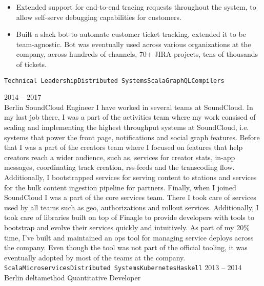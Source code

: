 \documentclass[9pt]{developercv} %
\begin{document}
\begin{entrylist}
{\begin{itemize}
				\item Extended support for end-to-end tracing requests throughout the system, to allow self-serve debugging capabilities for customers.
				\item Built a slack bot to automate customer ticket tracking, extended it to be team-agnostic. Bot was eventually used across various organizations at the company, across hundreds of channels, 70+ JIRA projects, tens of thousands of tickets.
			\end{itemize}
			\texttt{Technical Leadership}\slashsep\texttt{Distributed Systems}\slashsep\texttt{Scala}\slashsep\texttt{GraphQL}\slashsep\texttt{Compilers}
		}
	\entry
		{2014 -- 2017\\\footnotesize{Berlin}}
		{SoundCloud}
		{Engineer}
		{
			I have worked in several teams at SoundCloud. In my last job there, I was a part of the activities team where my work consised of scaling and implementing the highest throughput systems at SoundCloud, i.e. systems that power the front page, notifications and social graph features.\newline\newline
			Before that I was a part of the creators team where I focused on features that help creators reach a wider audience, such as, services for creator stats, in-app messages, coordinating track creation, rss-feeds and the transcoding flow. Additionally, I bootstrapped services for serving content to stations and services for the bulk content ingestion pipeline for partners.\newline\newline
			Finally, when I joined SoundCloud I was a part of the core services team. There I took care of services used by all teams such as geo, authorizations and rollout services. Additionally, I took care of libraries built on top of Finagle to provide developers with tools to bootstrap and evolve their services quickly and intuitively.\newline\newline
			As part of my 20\% time, I've built and maintained an ops tool for managing service deploys across the company. Even though the tool was not part of the official tooling, it was eventually adopted by most of the teams at the company.\\
			\texttt{Scala}\slashsep\texttt{Microservices}\slashsep\texttt{Distributed Systems}\slashsep\texttt{Kubernetes}\slashsep\texttt{Haskell}}
	\entry
		{2013 -- 2014\\\footnotesize{Berlin}}
		{deltamethod}
		{Quantitative Developer}

\end{entrylist}
\end{document}
